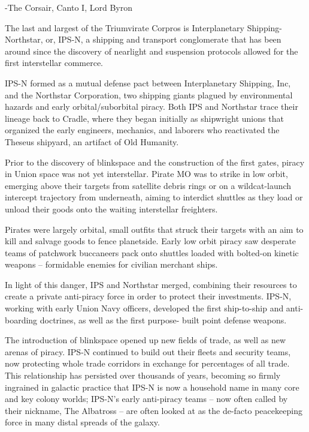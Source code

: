                                  -The Corsair, Canto I, Lord Byron  

The last and largest of the Triumvirate Corpros is Interplanetary Shipping-Northstar, or, IPS-N, a  
shipping and transport conglomerate that has been around since the discovery of nearlight and  
suspension protocols allowed for the first interstellar commerce.   

IPS-N formed as a mutual defense pact between Interplanetary Shipping, Inc, and the Northstar  
Corporation, two shipping giants plagued by environmental hazards and early orbital/suborbital  
piracy. Both IPS and Northstar trace their lineage back to Cradle, where they began initially as  
shipwright unions that organized the early engineers, mechanics, and laborers who reactivated  
the Theseus shipyard, an artifact of Old Humanity.   

Prior to the discovery of blinkspace and the construction of the first gates, piracy in Union space  
was not yet interstellar. Pirate MO was to strike in low orbit, emerging above their targets from  
satellite debris rings or on a wildcat-launch intercept trajectory from underneath, aiming to interdict  
shuttles as they load or unload their goods onto the waiting interstellar freighters.  

Pirates were largely orbital, small outfits that struck their targets with an aim to kill and salvage  
goods to fence planetside. Early low orbit piracy saw desperate teams of patchwork buccaneers  
pack onto shuttles loaded with bolted-on kinetic weapons -- formidable enemies for civilian  
merchant ships.   

In light of this danger, IPS and Northstar merged, combining their resources to create a private  
anti-piracy force in order to protect their investments. IPS-N, working with early Union Navy  
officers, developed the first ship-to-ship and anti-boarding doctrines, as well as the first purpose- 
built point defense weapons.  

The introduction of blinkspace opened up new fields of trade, as well as new arenas of piracy.  
IPS-N continued to build out their fleets and security teams, now protecting whole trade corridors  
in exchange for percentages of all trade. This relationship has persisted over thousands of years,  
becoming so firmly ingrained in galactic practice that IPS-N is now a household name in many  
core and key colony worlds; IPS-N’s early anti-piracy teams -- now often called by their nickname,  
The Albatross -- are often looked at as the de-facto peacekeeping force in many distal spreads of  
the galaxy.   


